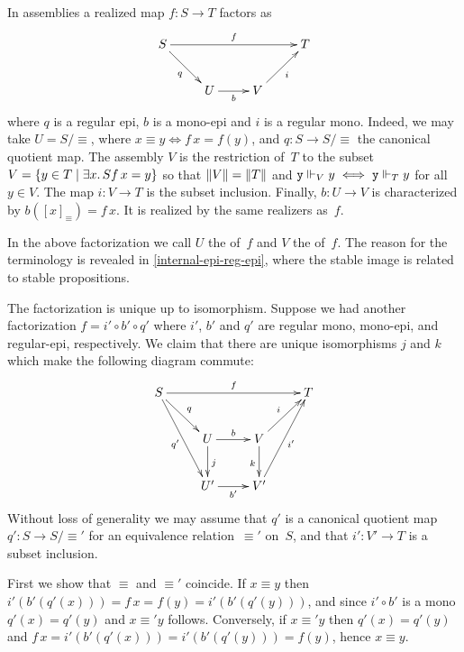 In assemblies a realized map $f : S \to T$ factors as
%
\begin{equation*}
  \xymatrix{
    {S}
    \ar[rrr]^{f}
    \ar[rd]_{q}
    &
    &
    &
    {T}
    \\
    &
    {U}
    \ar[r]_{b}
    &
    {V}
    \ar[ru]_{i}
    &
  }
\end{equation*}
%
where $q$ is a regular epi, $b$ is a mono-epi and $i$ is a regular
mono. Indeed, we may take $U = S/{\equiv}$, where $x
\equiv y \iff f\,x = f(y)$, and $q : S \to S/{\equiv}$ the
canonical quotient map. The assembly $V$ is the restriction
of~$T$ to the subset $V = \set{y \in T \such \some{x}{S}{f\,x =
    y}}$ so that $\T{V} = \T{T}$ and $\R{y} \rz[V] y \iff \R{y} \rz[T] y$
for all $y \in V$. The map $i : V \to T$ is the subset inclusion.
Finally, $b : U \to V$ is characterized by $b([x]_{\equiv}) = f\,x$.
It is realized by the same realizers as~$f$.

In the above factorization we call $U$ the  of~$f$
and $V$ the  of~$f$. The reason for the
terminology is revealed in \cref{internal-epi-reg-epi}, where
the stable image is related to stable propositions.

The factorization is unique up to isomorphism. Suppose we had another
factorization $f = i' \circ b' \circ q'$ where $i'$, $b'$ and $q'$ are
regular mono, mono-epi, and regular-epi, respectively. We claim that
there are unique isomorphisms $j$ and $k$ which make the following
diagram commute:
%
\begin{equation*}
  \xymatrix{
    {S}
    \ar[rrr]^{f}
    \ar[rd]^{q}
    \ar[rdd]_{q'}
    &
    &
    &
    {T}
    \\
    &
    {U}
    \ar[r]^{b}
    \ar[d]^{j}
    &
    {V}
    \ar[ru]^{i}
    \ar[d]_{k}
    &
    \\
    &
    {U'}
    \ar[r]_{b'}
    &
    {V'}
    \ar[ruu]_{i'}
    &    
  }
\end{equation*}
%
Without loss of generality we may assume that $q'$ is a canonical
quotient map $q' : S \to S/{\equiv'}$ for an equivalence
relation~$\equiv'$ on~$S$, and that $i' : V' \to T$ is a subset
inclusion.

First we show that $\equiv$ and $\equiv'$ coincide. If $x \equiv y$
then $i'(b'(q'(x))) = f\,x = f(y) = i'(b'(q'(y)))$, and since $i'
\circ b'$ is a mono $q'(x) = q'(y)$ and $x \equiv' y$ follows.
Conversely, if $x \equiv' y$ then $q'(x) = q'(y)$ and $f\,x =
i'(b'(q'(x))) = i'(b'(q'(y))) = f(y)$, hence $x \equiv y$.

